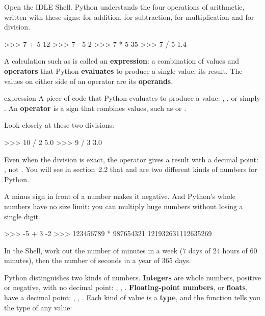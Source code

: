 Open the IDLE Shell. Python understands the four operations of arithmetic, written with these signs:
\py{+} for addition, \py{-} for subtraction, \py{*} for multiplication and \py{/} for division.

\begin{console}
>>> 7 + 5
12
>>> 7 - 5
2
>>> 7 * 5
35
>>> 7 / 5
1.4
\end{console}

A calculation such as  is called an \textbf{expression}: a combination of values and
\textbf{operators} that Python \textbf{evaluates} to produce a single value, its result. The values
on either side of an operator are its \textbf{operands}.

\begin{definition}{expression}
A piece of code that Python evaluates to produce a value: , , or simply
. An \textbf{operator} is a sign that combines values, such as \py{+} or \py{*}.
\end{definition}

Look closely at these two divisions:

\begin{console}
>>> 10 / 2
5.0
>>> 9 / 3
3.0
\end{console}

Even when the division is exact, the operator \py{/} gives a result with a decimal point:
, not . You will see in section~2.2 that  and  are two different kinds
of numbers for Python.

A minus sign in front of a number makes it negative. And Python's whole numbers have no size limit:
you can multiply huge numbers without losing a single digit.

\begin{console}
>>> -5 + 3
-2
>>> 123456789 * 987654321
121932631112635269
\end{console}

\begin{atoi}
In the Shell, work out the number of minutes in a week ($7$ days of $24$ hours of $60$ minutes), then
the number of seconds in a year of 365 days.
\end{atoi}


Python distinguishes two kinds of numbers. \textbf{Integers} are whole numbers, positive or negative,
with no decimal point: , , . \textbf{Floating-point numbers}, or
\textbf{floats}, have a decimal point: , , . Each kind of value is a
\textbf{type}, and the function  tells you the type of any value:

